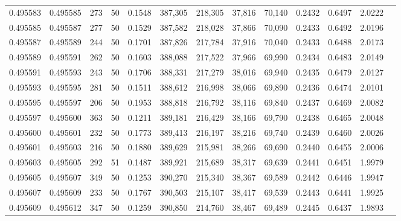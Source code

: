 \begin{tabular}{rrrrrrrrrrrrr}
0.495583 & 0.495585 &   273 &  50 &                                     0.1548 & 387,305 & 218,305 &  37,816 &  70,140 & 0.2432 & 0.6497 & 2.0222 \\
0.495585 & 0.495587 &   277 &  50 &                                     0.1529 & 387,582 & 218,028 &  37,866 &  70,090 & 0.2433 & 0.6492 & 2.0196 \\
0.495587 & 0.495589 &   244 &  50 &                                     0.1701 & 387,826 & 217,784 &  37,916 &  70,040 & 0.2433 & 0.6488 & 2.0173 \\
0.495589 & 0.495591 &   262 &  50 &                                     0.1603 & 388,088 & 217,522 &  37,966 &  69,990 & 0.2434 & 0.6483 & 2.0149 \\
0.495591 & 0.495593 &   243 &  50 &                                     0.1706 & 388,331 & 217,279 &  38,016 &  69,940 & 0.2435 & 0.6479 & 2.0127 \\
0.495593 & 0.495595 &   281 &  50 &                                     0.1511 & 388,612 & 216,998 &  38,066 &  69,890 & 0.2436 & 0.6474 & 2.0101 \\
0.495595 & 0.495597 &   206 &  50 &                                     0.1953 & 388,818 & 216,792 &  38,116 &  69,840 & 0.2437 & 0.6469 & 2.0082 \\
0.495597 & 0.495600 &   363 &  50 &                                     0.1211 & 389,181 & 216,429 &  38,166 &  69,790 & 0.2438 & 0.6465 & 2.0048 \\
0.495600 & 0.495601 &   232 &  50 &                                     0.1773 & 389,413 & 216,197 &  38,216 &  69,740 & 0.2439 & 0.6460 & 2.0026 \\
0.495601 & 0.495603 &   216 &  50 &                                     0.1880 & 389,629 & 215,981 &  38,266 &  69,690 & 0.2440 & 0.6455 & 2.0006 \\
0.495603 & 0.495605 &   292 &  51 &                                     0.1487 & 389,921 & 215,689 &  38,317 &  69,639 & 0.2441 & 0.6451 & 1.9979 \\
0.495605 & 0.495607 &   349 &  50 &                                     0.1253 & 390,270 & 215,340 &  38,367 &  69,589 & 0.2442 & 0.6446 & 1.9947 \\
0.495607 & 0.495609 &   233 &  50 &                                     0.1767 & 390,503 & 215,107 &  38,417 &  69,539 & 0.2443 & 0.6441 & 1.9925 \\
0.495609 & 0.495612 &   347 &  50 &                                     0.1259 & 390,850 & 214,760 &  38,467 &  69,489 & 0.2445 & 0.6437 & 1.9893 \\

\end{tabular}
